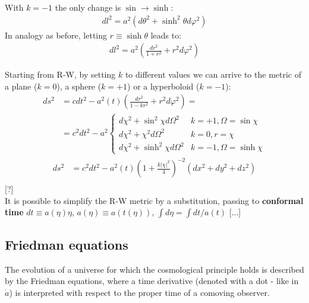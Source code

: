 \documentclass[../PhysUniverse.tex]{subfiles}
\begin{document}
With $k=-1$ the only change is $\sin\to\sinh$:
\begin{align*}
dl^2 = a^2(d\theta^2 + \sinh^2 \theta d\varphi^2)
\end{align*}
In analogy as before, letting $r\equiv \sinh\theta$ leads to:
\begin{align*}
dl^2 = a^2 \left(\frac{dr^2}{1+r^2}+r^2d\varphi^2\right)
\end{align*}

Starting from R-W, by setting $k$ to different values we can arrive to the metric of a plane ($k=0$), a sphere ($k=+1$) or a hyperboloid ($k=-1$):
\begin{align*}
ds^2 &= cdt^2 -a^2(t) \left(\frac{dr^2}{1-kr^2} + r^2 d\varphi^2\right) =\\
&= c^2 dt^2 - a^2 \begin{cases}
d\chi^2 + \sin^2 \chi d\Omega^2 & k=+1, \Omega = \sin \chi\\
d\chi^2 + \chi^2 d\Omega^2 & k=0, r=\chi\\
d\chi^2 + \sinh^2 \chi d\Omega^2 & k=-1,\Omega = \sinh\chi
\end{cases}
\end{align*}
\begin{align*}
ds^2 &= c^2 dt^2 - a^2(t) \left(1+ \frac{k|\chi|^2}{4}\right)^{-2}(dx^2+dy^2+dz^2)\\
\end{align*} [?]\\

It is possible to simplify the R-W metric by a substitution, passing to \textbf{conformal time} $dt \equiv a(\eta)\eta$, $a(\eta)\equiv a(t(\eta))$, $\int d\eta = \int dt/a(t)$
[...]\\


\subsection{Friedman equations}
The evolution of a universe for which the cosmological principle holds is described by the Friedman equations, where a time derivative (denoted with a dot - like in $\dot{a}$) is interpreted with respect to the proper time of a comoving observer.\\
\end{document}
